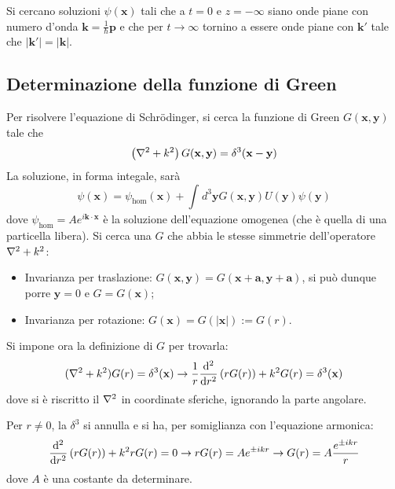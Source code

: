 Si cercano soluzioni $\psi(\mathbf{x})$ tali che a $t=0$ e $z=-\infty$ siano onde piane con numero
d'onda $\mathbf{k}=\frac{1}{\hbar}\mathbf{p}$ e che per $t\to\infty$ tornino a essere onde piane
con $\mathbf{k'}$ tale che $|\mathbf{k'}|=|\mathbf{k}|$.
\subsection{Determinazione della funzione di Green}
Per risolvere l'equazione di Schrödinger, si cerca la funzione di Green $G(\mathbf{x},\mathbf{y})$
tale che
$$\left(\laplacian + k^2\right)G(\mathbf{x},\mathbf{y}) = \delta^3(\mathbf{x}-\mathbf{y})$$
La soluzione, in forma integale, sarà
$$\psi(\mathbf{x}) = \psi_\text{hom}(\mathbf{x}) +
\int_{}^{}d^3\mathbf{y}G(\mathbf{x},\mathbf{y})U(\mathbf{y})\psi(\mathbf{y})$$
dove $\psi_\text{hom} = Ae^{i\mathbf{k}\cdot\mathbf{x}}$ è la soluzione dell'equazione omogenea
(che è quella di una particella libera).
\newpage
Si cerca una $G$ che abbia le stesse simmetrie dell'operatore $\laplacian + k^2$:
\begin{itemize}
    \item Invarianza per traslazione: $G(\mathbf{x},\mathbf{y})=G(\mathbf{x+a},\mathbf{y+a})$,
	si può dunque porre $\mathbf{y}=0$ e $G=G(\mathbf{x})$;
    \item Invarianza per rotazione: $G(\mathbf{x})=G(|\mathbf{x}|):=G(r)$.
\end{itemize}
Si impone ora la definizione di $G$ per trovarla:
$$(\laplacian + k^2)G(r) = \delta^3(\mathbf{x})\rightarrow
\frac{1}{r}\dv[2]{}{r}\left(rG(r)\right)+k^2G(r)=\delta^3(\mathbf{x})$$
dove si è riscritto il $\laplacian$ in coordinate sferiche, ignorando la parte angolare.

Per $r\not=0$, la $\delta^3$ si annulla e si ha, per somiglianza con l'equazione armonica:
$$\dv[2]{}{r} \left(rG(r)\right)+k^2rG(r)=0 \to rG(r)=Ae^{\pm ikr} \to G(r)= A\frac{e^{\pm ikr}}{r}$$
dove $A$ è una costante da determinare.
